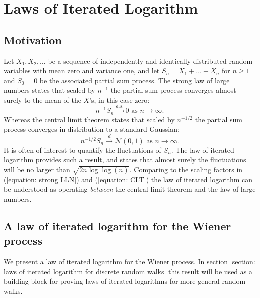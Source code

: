 \documentclass{article}
\begin{document}
\section{Laws of Iterated Logarithm}

\subsection{Motivation}

Let $X_1, X_2, \dots$ be a sequence of independently and identically distributed random variables with mean zero and variance one, and let $S_n = X_1 + \dots + X_n$ for $n \geq 1$ and $S_0 = 0$ be the associated partial sum process. The strong law of large numbers states that scaled by $n^{-1}$ the partial sum process converges almost surely to the mean of the $X$'s, in this case zero: 
\begin{equation}
	n^{-1} S_n \xrightarrow{a.s.} 0 \text{ as } n \rightarrow \infty. 
	\label{equation: strong LLN}
\end{equation}
Whereas the central limit theorem states that scaled by $n^{-1/2}$ the partial sum process converges in distribution to a standard Gaussian: 
\begin{equation}
	n^{-1/2} S_n \xrightarrow{d} \mathcal{N} \left ( 0, 1 \right ) \text{ as } n \rightarrow \infty. 
	\label{equation: CLT}
\end{equation}
It is often of interest to quantify the fluctuations of $S_n$. The law of iterated logarithm provides such a result, and states that almost surely the fluctuations will be no larger than $\sqrt{2 n \log \log (n)}$. Comparing to the scaling factors in (\ref{equation: strong LLN}) and (\ref{equation: CLT}) the law of iterated logarithm can be understood as operating \emph{between} the central limit theorem and the law of large numbers. 

\subsection{A law of iterated logarithm for the Wiener process}

We present a law of iterated logarithm for the Wiener process. In section \ref{section: laws of iterated logarithm for discrete random walks} this result will be used as a building block for proving laws of iterated logarithms for more general random walks. 
\end{document}
